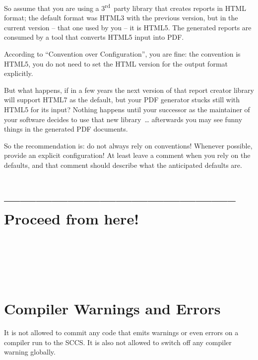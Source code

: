 \documentclass[11pt,a4paper, titlepage, parskip=half, headsepline, footsepline, cleardoublepage=current, headheight=1cm]{scrbook}
\begin{document}
So assume that you are using a 3\textsuperscript{rd}~party library that creates reports in HTML format; the default format was HTML3 with the previous version, but in the current version – that one used by you – it is HTML5. The generated reports are consumed by a tool that converts HTML5 input into PDF.

According to “Convention over Configuration”, you are fine: the convention is HTML5, you do not need to set the HTML version for the output format explicitly.

But what happens, if in a few years the next version of that report creator library will support HTML7 as the default, but your PDF generator stucks still with HTML5 for its input? Nothing happens until your successor as the maintainer of your software decides to use that new library~… afterwards you may see funny things in the generated PDF documents.

So the recommendation is: do not always rely on conventions! Whenever possible, provide an explicit configuration! At least leave a comment when you rely on the defaults, and that comment should describe what the anticipated defaults are.

\section{-------------------------------------------- Proceed from here!}

\begin{lstlisting}
\end{lstlisting}

\begin{lstlisting}
\end{lstlisting}

\begin{lstlisting}
\end{lstlisting}

\begin{lstlisting}
\end{lstlisting}

\begin{lstlisting}
\end{lstlisting}

\begin{lstlisting}
\end{lstlisting}

\begin{lstlisting}
\end{lstlisting}

\section{Compiler Warnings and Errors}\label{sec:CompilerWarningsAndErrors}
It is not allowed to commit any code that emits warnings or even errors on a compiler run to the SCCS. It is also not allowed to switch off any compiler warning globally.
\end{document}
